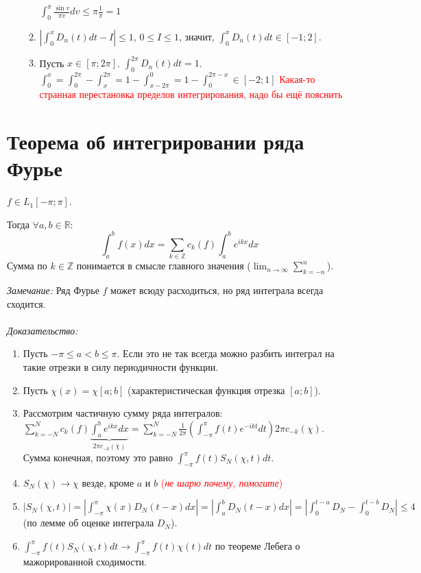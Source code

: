 \documentclass[paper=a4, fontsize=17pt]{article}
\begin{document}
\begin{enumerate}
\begin{enumerate}
            $\int_0^\pi \frac{\sin v}{\pi v} dv \leq \pi \frac{1}{\pi} = 1$
        \item $|\int_0^x D_n(t) dt - I| \leq 1$, $0 \leq I \leq 1$, значит, $\int_0^x D_n(t) dt \in [-1;2]$.
        \item Пусть $x \in [\pi;2\pi]$. $\int_0^{2\pi}D_n(t) dt = 1$.\\
            $\int_0^x = \int_0^{2\pi} - \int_x^{2\pi} = 1 - \int_{x-2\pi}^0 = 1 - \int_0^{2\pi-x} \in [-2;1]$
            \textcolor{red}{Какая-то странная перестановка пределов интегрирования, надо бы ещё пояснить}
    \end{enumerate}
\end{enumerate}

\section{Теорема об интегрировании ряда Фурье}
$f \in L_1[-\pi;\pi]$.

Тогда $\forall a, b \in \mathbb{R}$:
$$\int_a^b f(x)dx = \sum_{k\in\mathbb{Z}} c_k(f) \int_a^b e^{ikx} dx$$
Сумма по $k \in \mathbb{Z}$ понимается в смысле главного значения ($\lim_{n \to \infty} \sum_{k=-n}^n$).

\emph{Замечание:} Ряд Фурье $f$ может всюду расходиться, но ряд интеграла всегда сходится.
\\\\
\emph{Доказательство:}

\begin{enumerate}
    \item Пусть $-\pi \leq a < b \leq \pi$. Если это не так всегда можно разбить интеграл на такие отрезки в силу периодичности функции.
    \item Пусть $\chi(x) = \chi[a;b]$ (характеристическая функция отрезка $[a;b]$).
    \item Рассмотрим частичную сумму ряда интегралов:\\
        $\sum_{k=-N}^N c_k(f) \underbrace{\int_a^b e^{ikx} dx}_{2\pi c_{-k}(\chi)} =
        \sum_{k=-N}^N \frac{1}{2\pi} (\int_{-\pi}^\pi f(t) e^{-ikt} dt) 2\pi c_{-k}(\chi)$.\\
        Сумма конечная, поэтому это равно $\int_{-\pi}^{\pi} f(t) S_N(\chi,t) dt$.
    \item $S_N(\chi) \to \chi$ везде, кроме $a$ и $b$ \textcolor{red}{(\emph{не шарю почему, помогите})}
    \item $|S_N(\chi,t)| = |\int_{-\pi}^\pi \chi(x)D_N(t-x)dx| = |\int_a^b D_N(t-x)dx| =
        |\int_0^{t-a}D_N - \int_0^{t-b}D_N| \leq 4$ (по лемме об оценке интеграла $D_N$).
    \item $\int_{-\pi}^\pi f(t)S_N(\chi,t) dt \to \int_{-\pi}^\pi f(t) \chi(t) dt$ по теореме Лебега о мажорированной сходимости.
\end{enumerate}
\end{document}
